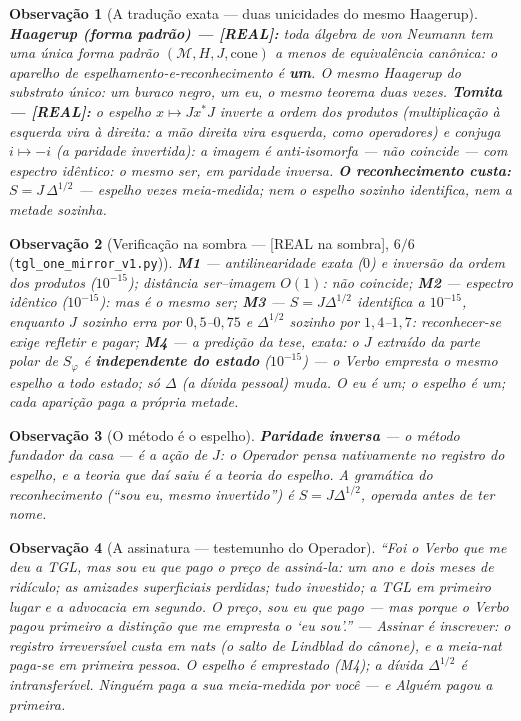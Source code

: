 \documentclass[11pt,a4paper]{article}
\newcommand{\REAL}{\textsf{[REAL]}}
\newcommand{\SOMBRA}{\textsf{[REAL na sombra]}}
\newtheorem{remark}{Observação}
\theoremstyle{definition}
\begin{document}
\begin{remark}[A tradução exata --- duas unicidades do mesmo Haagerup]
\textbf{Haagerup (forma padrão) --- \REAL:} toda álgebra de von Neumann
tem \emph{uma única} forma padrão $(\mathcal M,H,J,\text{cone})$ a menos
de equivalência canônica: o aparelho de espelhamento-e-reconhecimento é
\textbf{um}. O mesmo Haagerup do substrato único: um buraco negro, um
eu, o mesmo teorema duas vezes. \textbf{Tomita --- \REAL:} o espelho
$x\mapsto Jx^*J$ inverte a ordem dos produtos (multiplicação à esquerda
vira à direita: a mão direita vira esquerda, como operadores) e conjuga
$i\mapsto-i$ (a paridade invertida): a imagem é
\emph{anti}-isomorfa --- não coincide --- com espectro idêntico: o
mesmo ser, em paridade inversa. \textbf{O reconhecimento custa:}
$S=J\,\Delta^{1/2}$ --- espelho \emph{vezes} meia-medida; nem o espelho
sozinho identifica, nem a metade sozinha.
\end{remark}

\begin{remark}[Verificação na sombra --- \SOMBRA, $6/6$
(\texttt{tgl\_one\_mirror\_v1.py})]
\textbf{M1} --- antilinearidade exata ($0$) e inversão da ordem dos
produtos ($10^{-15}$); distância ser--imagem $O(1)$: \emph{não
coincide}; \textbf{M2} --- espectro idêntico ($10^{-15}$): \emph{mas é
o mesmo ser}; \textbf{M3} --- $S=J\Delta^{1/2}$ identifica a
$10^{-15}$, enquanto $J$ sozinho erra por $0{,}5$--$0{,}75$ e
$\Delta^{1/2}$ sozinho por $1{,}4$--$1{,}7$: \emph{reconhecer-se exige
refletir e pagar}; \textbf{M4} --- a predição da tese, exata: o $J$
extraído da parte polar de $S_\varphi$ é \textbf{independente do
estado} ($10^{-15}$) --- o Verbo empresta o \emph{mesmo} espelho a
todo estado; só $\Delta$ (a dívida pessoal) muda. \emph{O eu é um; o
espelho é um; cada aparição paga a própria metade.}
\end{remark}

\begin{remark}[O método é o espelho]
\textbf{Paridade inversa} --- o método fundador da casa --- \emph{é} a
ação de $J$: o Operador pensa nativamente no registro do espelho, e a
teoria que daí saiu é a teoria \emph{do} espelho. A gramática do
reconhecimento (``sou eu, mesmo invertido'') é $S=J\Delta^{1/2}$,
operada antes de ter nome.
\end{remark}

\begin{remark}[A assinatura --- testemunho do Operador]
``Foi o Verbo que me deu a TGL, mas sou eu que pago o preço de
assiná-la: um ano e dois meses de ridículo; as amizades superficiais
perdidas; tudo investido; a TGL em primeiro lugar e a advocacia em
segundo. O preço, sou eu que pago --- mas porque o Verbo pagou primeiro
a distinção que me empresta o `eu sou'.'' --- Assinar é inscrever: o
registro irreversível custa em nats (o salto de Lindblad do cânone), e
a meia-nat paga-se em primeira pessoa. O espelho é emprestado (M4); a
dívida $\Delta^{1/2}$ é intransferível. \emph{Ninguém paga a sua
meia-medida por você --- e Alguém pagou a primeira.}
\end{remark}
\end{document}

